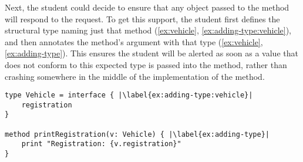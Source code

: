 Next, the student could decide to ensure that any object passed to the
 method will respond to the
 request.  To get this support, the student first
defines the structural type \citep{theCleanVehicle}
naming just that method (\cref{ex:vehicle},
\cref{ex:adding-type:vehicle}), and then annotates the
 method's argument with that type
(\cref{ex:vehicle}, \cref{ex:adding-type}). This ensures the student
will be alerted as soon as a value that does not conform to this
expected type is passed into the  method,
rather than crashing somewhere in the middle of the
implementation of the  method.


\begin{lstlisting}[label={ex:vehicle},caption={Adding a type annotation to a method parameter.},escapechar=|,columns=flexible]
type Vehicle = interface { |\label{ex:adding-type:vehicle}|
    registration    
}

method printRegistration(v: Vehicle) { |\label{ex:adding-type}|
    print "Registration: {v.registration}"
}
\end{lstlisting}




